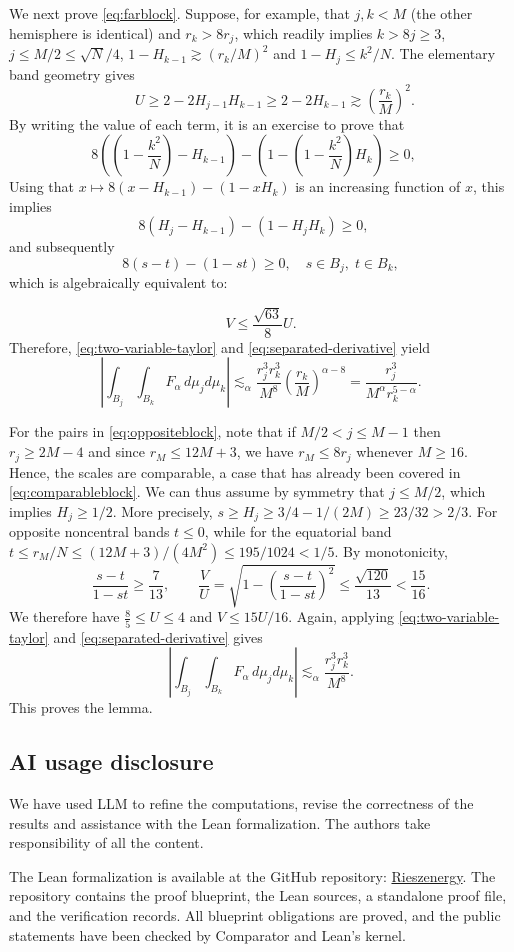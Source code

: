 \documentclass[11pt]{amsart}
\begin{document}
We next prove \eqref{eq:farblock}. Suppose, for example, that
$j,k<M$ (the other hemisphere is identical) and $r_k>8r_j$, which readily implies $k>8j\geq3$, $j\leq M/2\leq \sqrt{N}/4$, $1-H_{k-1}\gtrsim (r_k/M)^2$ and $1-H_j\leq k^2/N$. The elementary
band geometry gives
\[
 \qquad
 U\ge 2-2H_{j-1}H_{k-1}\ge 2-2H_{k-1}\gtrsim\left(\frac{r_k}{M}\right)^2.
\]
By writing the value of each term, it is an exercise to prove that
\[
8\left(\left(1-\frac{k^2}{N}\right)-H_{k-1}\right)-\left(1-\left(1-\frac{k^2}{N}\right)H_{k}\right)\geq 0,\quad
\]
Using that $x\mapsto 8(x-H_{k-1})-(1-xH_{k})$ is an increasing function of $x$, this implies
\[
8(H_j-H_{k-1})-(1-H_{j}H_{k})\geq 0,\quad
\]
and subsequently
\[
8(s-t)-(1-st)\geq0,\quad s\in B_j,\; t\in B_k,
\]
which is algebraically equivalent to:

\[
V\leq\frac{\sqrt{63}}{8}U.
\]
Therefore, \eqref{eq:two-variable-taylor} and
\eqref{eq:separated-derivative} yield
\[
 \left|
\int_{B_j}\int_{B_k}F_\alpha\,d\mu_jd\mu_k
 \right|
 \lesssim_\alpha \frac{r_j^3r_k^3}{M^8}
 \left(\frac{r_k}{M}\right)^{\alpha-8}
 =\frac{r_j^3}{M^\alpha r_k^{5-\alpha}}.
\]

\noindent For the pairs in \eqref{eq:oppositeblock}, note that if $M/2<j\leq M-1$ then $r_j\geq 2M-4$ and since $r_M\leq 12M+3$, we have $r_M\leq 8r_j$ whenever $M\geq16$. Hence, the scales are comparable, a case that has already been covered in \eqref{eq:comparableblock}. We can thus assume by symmetry that $j\leq M/2$, which implies $H_j\geq1/2$. More precisely,
$s\ge H_j\ge3/4-1/(2M)\ge23/32>2/3$.
For opposite noncentral bands $t\le0$, while for the equatorial band
$t\le r_M/N\le(12M+3)/(4M^2)\le195/1024<1/5$.
By monotonicity,
\[
 \frac{s-t}{1-st}\ge\frac7{13},\qquad
 \frac VU=\sqrt{1-\left(\frac{s-t}{1-st}\right)^2}
 \le\frac{\sqrt{120}}{13}<\frac{15}{16}.
\]
We therefore have $\frac85\leq U\leq 4$
and $V\le15U/16$. Again, applying
\eqref{eq:two-variable-taylor} and \eqref{eq:separated-derivative} gives
\[
 \left|
 \int_{B_j}\int_{B_k}F_\alpha\,d\mu_jd\mu_k
 \right|
 \lesssim_\alpha\frac{r_j^3r_k^3}{M^8}.
\]
This proves the lemma.

\subsection*{AI usage disclosure}
We have used LLM to refine the computations, revise the correctness of the results and assistance with the Lean formalization. The authors take responsibility of all the content.

The Lean formalization is available at the GitHub repository:
\href{https://github.com/joaquimortega/Rieszenergy}{Rieszenergy}.
The repository contains the proof blueprint, the Lean sources, a standalone
proof file, and the verification records. All blueprint obligations are
proved, and the public statements have been checked by Comparator and
Lean's kernel.
\end{document}
